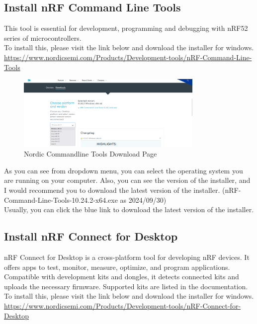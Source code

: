 \documentclass[11pt]{article}
\begin{document}
\subsection{Install nRF Command Line Tools}
This tool is essential for development, programming and debugging with nRF52 series of microcontrollers. \\
To install this, please visit the link below and download the installer for windows. \\
\url{https://www.nordicsemi.com/Products/Development-tools/nRF-Command-Line-Tools}

\begin{figure}[H]
\centering
\includegraphics[width=0.8\textwidth]{command.png}
\caption{Nordic Commandline Tools Download Page}
\label{fig:command_line_tools}
\end{figure}
As you can see from dropdown menu, you can select the operating system you are running on your computer. 
Also, you can see the version of the installer, and I would recommend you to download the latest version of the installer. (nRF-Command-Line-Tools-10.24.2-x64.exe as 2024/09/30) \\
Usually, you can click the blue link to download the latest version of the installer. \\

\subsection{Install nRF Connect for Desktop}
nRF Connect for Desktop is a cross-platform tool for developing nRF devices. It offers apps to test, monitor, measure, optimize, and program applications. Compatible with development kits and dongles, it detects connected kits and uploads the necessary firmware. Supported kits are listed in the documentation. \\
To install this, please visit the link below and download the installer for windows. \\
\url{https://www.nordicsemi.com/Products/Development-tools/nRF-Connect-for-Desktop}
\end{document}
